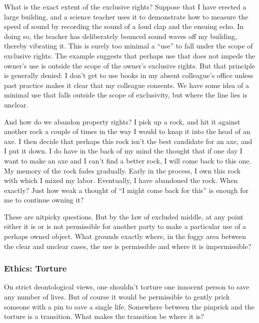 What is the exact extent of the exclusive rights? Suppose that I have erected a large 
building, and a science teacher uses it to demonstrate how to measure the speed of sound by recording the sound of a loud 
clap and the ensuing echo. In doing so, the teacher has deliberately bounced sound waves off my building, thereby vibrating 
it. This is surely too minimal a ``use'' to fall under the scope of exclusive rights. The example suggests that perhaps use that 
does not impede the owner's use is outside the scope of the owner's exclusive rights. But that principle is generally 
denied: I don't get to use books in my absent colleague's office unless past practice makes it clear that my 
colleague consents. We have some idea of a minimal use that falls outside the scope of exclusivity, but where the 
line lies is unclear.

And how do we abandon property rights? I pick up a rock, and hit it against another rock a couple of times in the way
I would to knap it into the head of an axe. I then decide that perhaps this rock isn't the best candidate for an axe, and I
put it down. I do have in the back of my mind the thought that if one day I want to make an axe and I can't find a better 
rock, I will come back to this one. My memory of the rock fades gradually. Early in the process, I own this 
rock with which I mixed my labor. Eventually, I have abandoned the rock. When exactly? Just how weak a thought of ``I might 
come back for this'' is enough for me to continue owning it? 

These are nitpicky questions. But by the law of excluded middle, at any point either it is or is not permissible 
for another party to make a 
particular use of a perhaps owned object. What grounds exactly where, in the foggy area between the clear and unclear cases, the
use is permissible and where it is impermissible? 

\subsubsection{Ethics: Torture}\label{sec:torture}
On strict deontological views, one shouldn't torture one innocent person to save any number of lives. But of course
it would be permissible to gently prick someone with a pin to save a single life. Somewhere between the pinprick
and the torture is a transition. What makes the transition be where it is?

